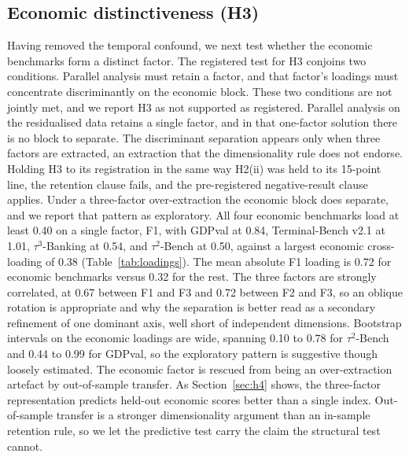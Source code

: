 \subsection{Economic distinctiveness (H3)}\label{sec:h3}
Having removed the temporal confound, we next test whether the economic benchmarks form a distinct
factor. The registered test for H3 conjoins two conditions. Parallel analysis must retain a factor, and that
factor's loadings must concentrate discriminantly on the economic block. These two conditions are not
jointly met, and we report H3 as not supported as registered. Parallel analysis on the residualised
data retains a single factor, and in that one-factor solution there is no block to separate. The
discriminant separation appears only when three factors are extracted, an extraction that the
dimensionality rule does not endorse. Holding H3 to its registration in the same way H2(ii) was held to
its 15-point line, the retention clause fails, and the pre-registered negative-result clause applies.
Under a three-factor over-extraction the economic block does separate, and we report that
pattern as exploratory. All four economic benchmarks load at least 0.40 on a single factor, F1, with
GDPval at 0.84, Terminal-Bench v2.1 at 1.01, $\tau^3$-Banking at 0.54, and $\tau^2$-Bench at 0.50,
against a largest economic cross-loading of 0.38 (Table~\ref{tab:loadings}). The mean absolute F1
loading is 0.72 for economic benchmarks versus 0.32 for the rest. The three factors are strongly
correlated, at 0.67 between F1 and F3 and 0.72 between F2 and F3, so an oblique rotation is
appropriate and why the separation is better read as a secondary refinement of one dominant axis, well short of
independent dimensions. Bootstrap intervals on the economic loadings are wide, spanning 0.10 to 0.78 for
$\tau^2$-Bench and 0.44 to 0.99 for GDPval, so the exploratory pattern is suggestive though loosely estimated. The economic factor is rescued from being an over-extraction artefact by out-of-sample
transfer. As Section~\ref{sec:h4} shows, the three-factor representation predicts held-out economic scores better than a single index. Out-of-sample transfer is a stronger dimensionality argument than an in-sample retention rule, so we let the predictive test carry the claim
the structural test cannot.



